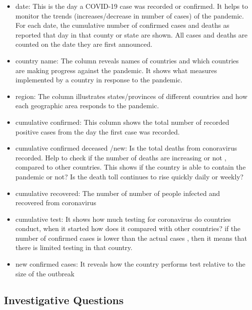 \documentclass[11pt]{article}
\begin{document}
\begin{itemize}
    \item date: This is the day a COVID-19 case was recorded or confirmed. It helps to monitor the trends (increases/decrease in number of cases) of the pandemic.
    For each date, the cumulative number of confirmed cases and deaths as reported that day in that county or state are shown. All cases and deaths are counted on the date they are first announced.
    
    \item country name: The column reveals names of countries and which countries are making progress against the pandemic. It shows what measures implemented by a country in response to the pandemic.
    
    \item region:  The column illustrates states/provinces of different countries and how each geographic area responds to the pandemic.
    
    \item cumulative confirmed: This column shows the total number of recorded positive cases from the day the first case was recorded. 
      
    \item cumulative confirmed deceased /new:  Is the total deaths from conoravirus recorded. Help to check if the number of deaths are increasing or not , compared to other countries. This shows if the country is able to contain the pandemic or not? Is the death toll continues to rise quickly daily or weekly?
    
    \item cumulative recovered: The number of number of people infected and recovered from coronavirus
      
     \item cumulative test:  It shows how much testing for coronavirus do countries conduct, when it started how does it compared with other countries? if the number of confirmed cases is lower than the actual cases , then it means that there is limited testing in that country.
      
    \item new confirmed cases:  It reveals how the country performs test relative to the size of the outbreak
    
\end{itemize}


\subsection{Investigative Questions}
\end{document}
